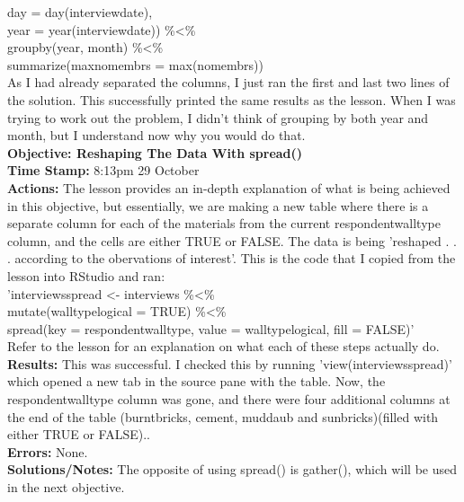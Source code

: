 \documentclass{article}
\begin{document}
\begin{FlushLeft}
day = day(interview\textunderscore date),\\
year = year(interview\textunderscore date)) \%\textless\%\\
group\textunderscore by(year, month) \%\textless\%\\
summarize(max\textunderscore no\textunderscore membrs = max(no\textunderscore membrs))\\
As I had already separated the columns, I just ran the first and last two lines of the solution. This successfully printed the same results as the lesson. When I was trying to work out the problem, I didn't think of grouping by both year and month, but I understand now why you would do that.\\
\vspace{5mm}
\textbf{Objective: Reshaping The Data With spread()}\\ 
\textbf{Time Stamp:} 8:13pm 29 October\\
\textbf{Actions:} The lesson provides an in-depth explanation of what is being achieved in this objective, but essentially, we are making a new table where there is a separate column for each of the materials from the current respondent\textunderscore wall\textunderscore type column, and the cells are either TRUE or FALSE. The data is being 'reshaped . . . according to the obervations of interest'. This is the code that I copied from the lesson into RStudio and ran:\\
'interviews\textunderscore spread \textless - interviews \%\textless\%\\
mutate(wall\textunderscore type\textunderscore logical = TRUE) \%\textless\%\\
spread(key = respondent\textunderscore wall\textunderscore type, value = wall\textunderscore type\textunderscore logical, fill = FALSE)'\\
Refer to the lesson for an explanation on what each of these steps actually do.\\
\textbf{Results:} This was successful. I checked this by running 'view(interviews\textunderscore spread)' which opened a new tab in the source pane with the table. Now, the respondent\textunderscore wall\textunderscore type column was gone, and there were four additional columns at the end of the table (burntbricks, cement, muddaub and sunbricks)(filled with either TRUE or FALSE)..\\
\textbf{Errors:} None.\\
\textbf{Solutions/Notes:} The opposite of using spread() is gather(), which will be used in the next objective.\\

\end{FlushLeft}
\end{document}
